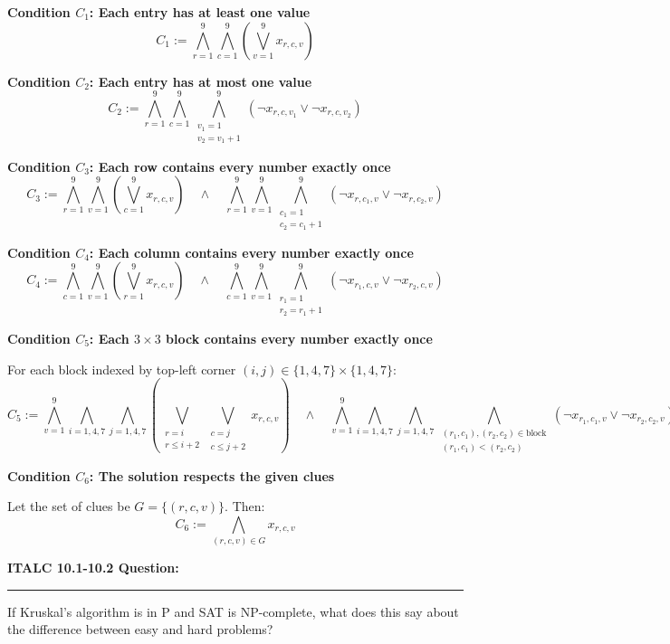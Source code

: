 \documentclass{article}
\theoremstyle{theorem}
\theoremstyle{definition}
\theoremstyle{remark}
\begin{document}
\begin{flushleft}
\textbf{Condition \( C_1 \): Each entry has at least one value}
\[
C_1 := \bigwedge_{r=1}^9 \bigwedge_{c=1}^9 \left( \bigvee_{v=1}^9 x_{r,c,v} \right)
\]

\textbf{Condition \( C_2 \): Each entry has at most one value}
\[
C_2 := \bigwedge_{r=1}^9 \bigwedge_{c=1}^9 \bigwedge_{\substack{v_1=1 \\ v_2 = v_1+1}}^9 \left( \neg x_{r,c,v_1} \lor \neg x_{r,c,v_2} \right)
\]

\textbf{Condition \( C_3 \): Each row contains every number exactly once}
\[
C_3 := \bigwedge_{r=1}^9 \bigwedge_{v=1}^9 \left( \bigvee_{c=1}^9 x_{r,c,v} \right) \quad \land \quad 
\bigwedge_{r=1}^9 \bigwedge_{v=1}^9 \bigwedge_{\substack{c_1=1 \\ c_2 = c_1+1}}^9 \left( \neg x_{r,c_1,v} \lor \neg x_{r,c_2,v} \right)
\]

\textbf{Condition \( C_4 \): Each column contains every number exactly once}
\[
C_4 := \bigwedge_{c=1}^9 \bigwedge_{v=1}^9 \left( \bigvee_{r=1}^9 x_{r,c,v} \right) \quad \land \quad 
\bigwedge_{c=1}^9 \bigwedge_{v=1}^9 \bigwedge_{\substack{r_1=1 \\ r_2 = r_1+1}}^9 \left( \neg x_{r_1,c,v} \lor \neg x_{r_2,c,v} \right)
\]

\textbf{Condition \( C_5 \): Each \( 3 \times 3 \) block contains every number exactly once}

For each block indexed by top-left corner \( (i,j) \in \{1,4,7\} \times \{1,4,7\} \):
\[
C_5 := \bigwedge_{v=1}^9 \bigwedge_{i=1,4,7} \bigwedge_{j=1,4,7} \left( \bigvee_{\substack{r=i \\ r \leq i+2}} \bigvee_{\substack{c=j \\ c \leq j+2}} x_{r,c,v} \right)
\quad \land \quad
\bigwedge_{v=1}^9 \bigwedge_{i=1,4,7} \bigwedge_{j=1,4,7} \bigwedge_{\substack{(r_1,c_1),(r_2,c_2) \in \text{block} \\ (r_1,c_1) < (r_2,c_2)}} \left( \neg x_{r_1,c_1,v} \lor \neg x_{r_2,c_2,v} \right)
\]

\textbf{Condition \( C_6 \): The solution respects the given clues}

Let the set of clues be \( G = \{(r,c,v)\} \). Then:
\[
C_6 := \bigwedge_{(r,c,v) \in G} x_{r,c,v}
\]
\end{flushleft}

\textbf{ITALC 10.1-10.2 Question:}
\vspace{0.5em}
\hrule
\vspace{0.5em}
If Kruskal’s algorithm is in P and SAT is NP-complete, what does this say about the difference between easy and hard problems?
\end{document}

